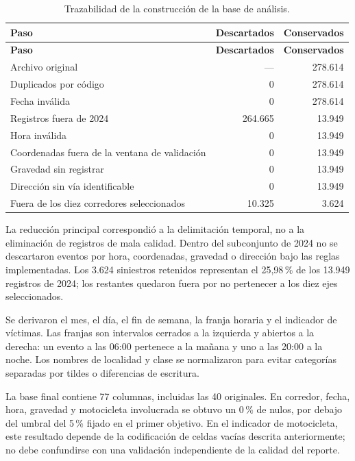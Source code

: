 \documentclass[12pt,letterpaper]{article}
\begin{document}
\begingroup
\begin{longtable}{@{}L{0.62}R{0.19}R{0.19}@{}}
\caption{Trazabilidad de la construcción de la base de análisis.}\label{tab:trazabilidad}\\
\toprule
\textbf{Paso} & \textbf{Descartados} & \textbf{Conservados}\\
\midrule
\endfirsthead
\toprule
\textbf{Paso} & \textbf{Descartados} & \textbf{Conservados}\\
\midrule
\endhead
Archivo original & --- & 278.614\\
Duplicados por código & 0 & 278.614\\
Fecha inválida & 0 & 278.614\\
Registros fuera de 2024 & 264.665 & 13.949\\
Hora inválida & 0 & 13.949\\
Coordenadas fuera de la ventana de validación & 0 & 13.949\\
Gravedad sin registrar & 0 & 13.949\\
Dirección sin vía identificable & 0 & 13.949\\
Fuera de los diez corredores seleccionados & 10.325 & 3.624\\
\bottomrule
\end{longtable}
\endgroup

La reducción principal correspondió a la delimitación temporal, no a la
eliminación de registros de mala calidad. Dentro del subconjunto de 2024
no se descartaron eventos por hora, coordenadas, gravedad o dirección
bajo las reglas implementadas. Los 3.624 siniestros retenidos representan
el 25,98\,\% de los 13.949 registros de 2024; los restantes quedaron fuera
por no pertenecer a los diez ejes seleccionados.

Se derivaron el mes, el día, el fin de semana, la franja horaria y el
indicador de víctimas. Las franjas son intervalos cerrados a la izquierda
y abiertos a la derecha: un evento a las 06:00 pertenece a la mañana y
uno a las 20:00 a la noche. Los nombres de localidad y clase se
normalizaron para evitar categorías separadas por tildes o diferencias
de escritura.

La base final contiene 77 columnas, incluidas las 40 originales. En
corredor, fecha, hora, gravedad y motocicleta involucrada se obtuvo un
0\,\% de nulos, por debajo del umbral del 5\,\% fijado en el primer
objetivo. En el indicador de motocicleta, este resultado depende de la
codificación de celdas vacías descrita anteriormente; no debe confundirse
con una validación independiente de la calidad del reporte.
\end{document}
